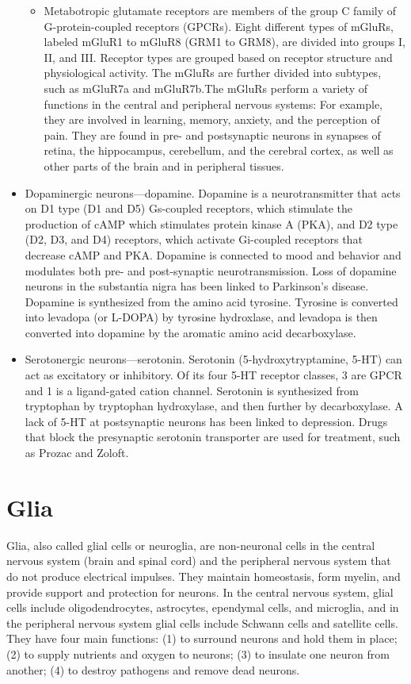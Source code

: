 \documentclass[]{book}
\begin{document}
\begin{itemize}
\begin{itemize}
  \item
    Metabotropic glutamate receptors are members of the group C family of G-protein-coupled receptors (GPCRs).
    Eight different types of mGluRs, labeled mGluR1 to mGluR8 (GRM1 to GRM8), are divided into groups I, II, and III. Receptor types are grouped based on receptor structure and physiological activity. The mGluRs are further divided into subtypes, such as mGluR7a and mGluR7b.The mGluRs perform a variety of functions in the central and peripheral nervous systems: For example, they are involved in learning, memory, anxiety, and the perception of pain. They are found in pre- and postsynaptic neurons in synapses of retina, the hippocampus, cerebellum, and the cerebral cortex, as well as other parts of the brain and in peripheral tissues.
  \end{itemize}
\item
  Dopaminergic neurons---dopamine. Dopamine is a neurotransmitter that acts on D1 type (D1 and D5) Gs-coupled receptors, which stimulate the production of cAMP which stimulates protein kinase A (PKA), and D2 type (D2, D3, and D4) receptors, which activate Gi-coupled receptors that decrease cAMP and PKA. Dopamine is connected to mood and behavior and modulates both pre- and post-synaptic neurotransmission. Loss of dopamine neurons in the substantia nigra has been linked to Parkinson's disease. Dopamine is synthesized from the amino acid tyrosine. Tyrosine is converted into levadopa (or L-DOPA) by tyrosine hydroxlase, and levadopa is then converted into dopamine by the aromatic amino acid decarboxylase.
\item
  Serotonergic neurons---serotonin. Serotonin (5-hydroxytryptamine, 5-HT) can act as excitatory or inhibitory. Of its four 5-HT receptor classes, 3 are GPCR and 1 is a ligand-gated cation channel. Serotonin is synthesized from tryptophan by tryptophan hydroxylase, and then further by decarboxylase. A lack of 5-HT at postsynaptic neurons has been linked to depression. Drugs that block the presynaptic serotonin transporter are used for treatment, such as Prozac and Zoloft.
\end{itemize}

\hypertarget{glia}{%
\section{Glia}\label{glia}}

Glia, also called glial cells or neuroglia, are non-neuronal cells in the central nervous system (brain and spinal cord) and the peripheral nervous system that do not produce electrical impulses. They maintain homeostasis, form myelin, and provide support and protection for neurons. In the central nervous system, glial cells include oligodendrocytes, astrocytes, ependymal cells, and microglia, and in the peripheral nervous system glial cells include Schwann cells and satellite cells. They have four main functions: (1) to surround neurons and hold them in place; (2) to supply nutrients and oxygen to neurons; (3) to insulate one neuron from another; (4) to destroy pathogens and remove dead neurons.
\end{document}
